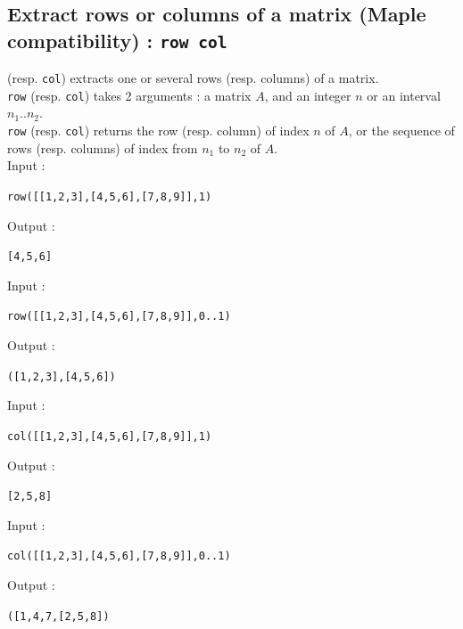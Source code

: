 \documentclass[a4paper,11pt]{book}
\begin{document}
\subsection{Extract rows or columns of a matrix (Maple compatibility) : {\tt row col}}
 (resp. {\tt col}) extracts one or several rows (resp. columns) 
of a matrix.\\
{\tt row} (resp. {\tt col}) takes 2 arguments : a matrix $A$, and an integer $n$
or an interval $n_1..n_2$.\\
{\tt row} (resp. {\tt col}) returns the row (resp. column) of index $n$ of $A$, 
or the sequence of rows (resp. columns) of index from $n_1$ to $n_2$ of $A$.\\
Input :
\begin{center}{\tt row([[1,2,3],[4,5,6],[7,8,9]],1)}\end{center}
Output :
\begin{center}{\tt [4,5,6]}\end{center}
Input :
\begin{center}{\tt row([[1,2,3],[4,5,6],[7,8,9]],0..1)}\end{center}
Output :
\begin{center}{\tt ([1,2,3],[4,5,6])}\end{center}
Input :
\begin{center}{\tt  col([[1,2,3],[4,5,6],[7,8,9]],1)}\end{center}
Output :
\begin{center}{\tt [2,5,8]}\end{center}
Input :
\begin{center}{\tt  col([[1,2,3],[4,5,6],[7,8,9]],0..1)}\end{center}
Output :
\begin{center}{\tt ([1,4,7,[2,5,8])}\end{center}
\end{document}
